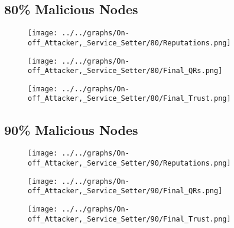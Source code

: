 \begin{minipage}[t]{0.49\columnwidth}
\subsection*{80\% Malicious Nodes}
    \begin{figure}[H]
        \centering
        \texttt{[image: ../../graphs/On-off\_Attacker,\_Service\_Setter/80/Reputations.png]}
    \end{figure}
    \begin{figure}[H]
        \centering
        \texttt{[image: ../../graphs/On-off\_Attacker,\_Service\_Setter/80/Final\_QRs.png]}
    \end{figure}
\end{minipage}
\begin{minipage}[t]{0.49\columnwidth}
    \begin{figure}[H]
        \centering
        \texttt{[image: ../../graphs/On-off\_Attacker,\_Service\_Setter/80/Final\_Trust.png]}
    \end{figure}
\end{minipage}

\begin{minipage}[t]{0.49\columnwidth}
\subsection*{90\% Malicious Nodes}
    \begin{figure}[H]
        \centering
        \texttt{[image: ../../graphs/On-off\_Attacker,\_Service\_Setter/90/Reputations.png]}
    \end{figure}
    \begin{figure}[H]
        \centering
        \texttt{[image: ../../graphs/On-off\_Attacker,\_Service\_Setter/90/Final\_QRs.png]}
    \end{figure}
\end{minipage}
\begin{minipage}[t]{0.49\columnwidth}
    \begin{figure}[H]
        \centering
        \texttt{[image: ../../graphs/On-off\_Attacker,\_Service\_Setter/90/Final\_Trust.png]}
    \end{figure}
\end{minipage}
\newpage

